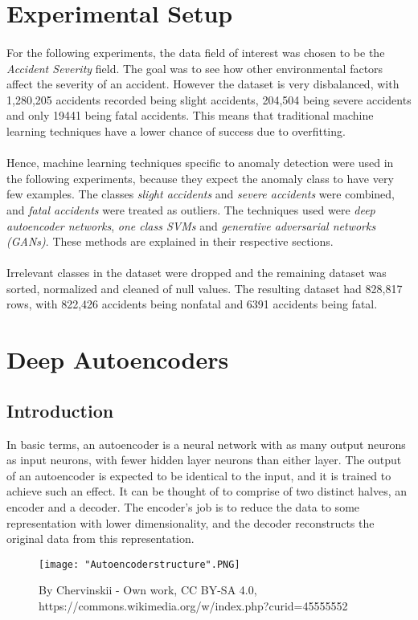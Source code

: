 \documentclass[a4paper, 12pt]{article}
\begin{document}
\section{Experimental Setup}
\paragraph{} For the following experiments, the data field of interest was chosen to be the \emph{Accident Severity} field. The goal was to see how other environmental factors affect the severity of an accident. However the dataset is very disbalanced, with 1,280,205 accidents recorded being slight accidents, 204,504 being severe accidents and only 19441 being fatal accidents. This means that traditional machine learning techniques have a lower chance of success due to overfitting.
\paragraph{} Hence, machine learning techniques specific to anomaly detection were used in the following experiments, because they expect the anomaly class to have very few examples. The classes \textit{slight accidents} and \textit{severe accidents} were combined, and \textit{fatal accidents} were treated as outliers.  The techniques used were \emph{deep autoencoder networks}, \emph{one class SVMs} and \emph{generative adversarial networks (GANs)}. These methods are explained in their respective sections.
\paragraph{} Irrelevant classes in the dataset were dropped and the remaining dataset was sorted, normalized and cleaned of null values. The resulting dataset had 828,817 rows, with 822,426 accidents being nonfatal and 6391 accidents being fatal.
\section{Deep Autoencoders}
\subsection{Introduction}In basic terms, an autoencoder is a neural network with as many output neurons as input neurons, with fewer hidden layer neurons than either layer. The output of an autoencoder is expected to be identical to the input, and it is trained to achieve such an effect. It can be thought of to comprise of two distinct halves, an encoder and a decoder. The encoder's job is to reduce the data to some representation with lower dimensionality, and the decoder reconstructs the original data from this representation.
\begin{figure}[h]
\centering
\texttt{[image: "Autoencoderstructure".PNG]}
\caption{By Chervinskii - Own work, CC BY-SA 4.0, https://commons.wikimedia.org/w/index.php?curid=45555552}
\end{figure}
\end{document}
